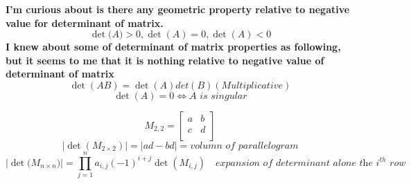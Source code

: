 \documentclass[10pt]{article}
\begin{document}
\textbf{I'm curious about is there any geometric property relative to negative value for determinant of matrix.}\\
$$\det{(A}) > 0, \det{(A)} = 0, \det{(A)} < 0$$
\textbf{I knew about some of determinant of matrix properties as following, but it seems to me that it is nothing relative to negative value of determinant of matrix}\\

$$\det{(AB)}=\det{(A)}det{(B)}(Multiplicative)$$
$$\det{(A)} = \textit{0} \iff \textit{A is singular}$$

$$
M_{2,2}=\begin{bmatrix}
a&b\\
c&d\\
\end{bmatrix}
$$
$$\lvert \det({M_{2 \times 2}}) \rvert = \lvert ad-bd \rvert=\textit{volumn of parallelogram}
$$
$$\lvert \det({M_{n\times n})}\rvert=\prod_{j=1}^n a_{i,j}(-1)^{i+j}\det({M_{i,j}})
\quad \textit{expansion of determinant alone the }\textit{i}^{th}\textit{ row}
$$
\end{document}
